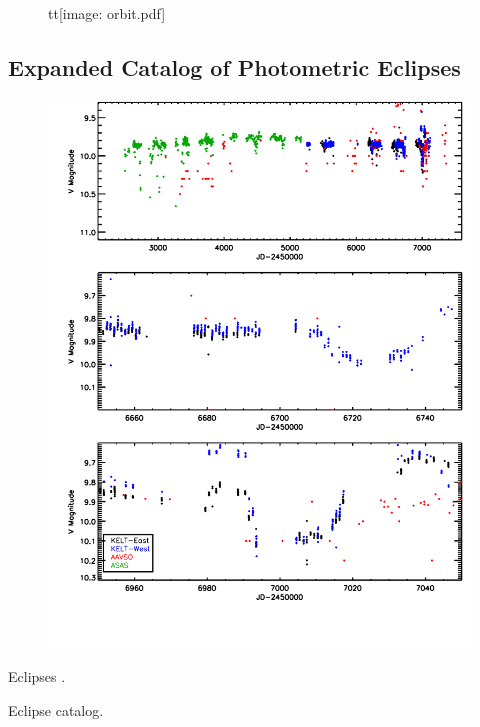 \documentclass{aastex6}
\begin{document}
\begin{figure}[htb]
\begin{center}
tt{[image: orbit.pdf]}
  \end{center}
\end{figure}

\subsection{Expanded Catalog of Photometric Eclipses}

\begin{figure}[htb]
\begin{center}
  \includegraphics[width=\textwidth]{KELT_eclipses.pdf}
  \end{center}
\end{figure}

Eclipses \citep{shevchenko92,shevchenko98}.

Eclipse catalog.
\end{document}
